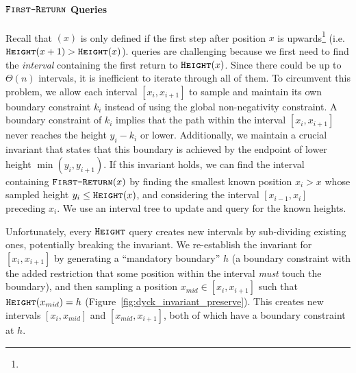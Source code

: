 \paragraph*{$\texttt{\textsc{First-Return}}$ Queries}
\label{par:_first-return_queries}
Recall that $(x)$ is only defined if the first step after position $x$ is upwards\footnote{
} (i.e. $\texttt{\textsc{Height}}(x+1) > \texttt{\textsc{Height}}(x)$).
 queries are challenging because we first need to find the \emph{interval} containing the first return to $\texttt{\textsc{Height}}(x)$.
Since there could be up to $\Theta(n)$ intervals, it is inefficient to iterate through all of them.
To circumvent this problem, we allow each interval $[x_i,x_{i+1}]$ to sample and maintain its own boundary constraint $k_i$
instead of using the global non-negativity constraint.
A boundary constraint of $k_i$ implies that the path within the interval $[x_i,x_{i+1}]$ never reaches the height $y_i-k_i$ or lower.
Additionally, we maintain a crucial invariant that states that this boundary is achieved by the endpoint of lower height $\min(y_i,y_{i+1})$.
If this invariant holds, we can find the interval containing $\texttt{\textsc{First-Return}}(x)$ by finding the smallest known position $x_i>x$
whose sampled height $y_i \le \texttt{\textsc{Height}}(x)$, and considering the interval $[x_{i-1},x_i]$ preceding $x_i$.
We use an interval tree to update and query for the known heights.

Unfortunately, every $\texttt{\textsc{Height}}$ query creates new intervals by sub-dividing existing ones, potentially breaking the invariant.
We re-establish the invariant for $[x_i,x_{i+1}]$ by generating a ``mandatory boundary'' $h$
(a boundary constraint with the added restriction that some position within the interval \emph{must} touch the boundary),
and then sampling a position $x_{mid}\in [x_i,x_{i+1}]$ such that $\texttt{\textsc{Height}}(x_{mid}) = h$ (Figure~\ref{fig:dyck_invariant_preserve}).
This creates new intervals $[x_i,x_{mid}]$ and $[x_{mid},x_{i+1}]$, both of which have a boundary constraint at $h$.

